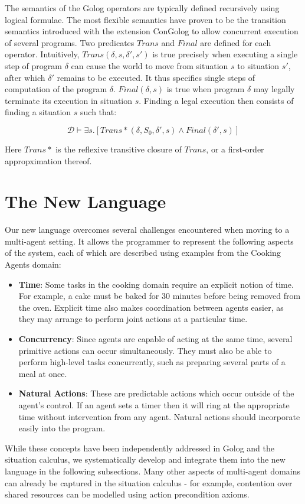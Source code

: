 \documentclass[letterpaper]{article}
\begin{document}
The semantics of the Golog operators are typically defined recursively
using logical formulae. The most flexible semantics have proven to
be the transition semantics introduced with the extension ConGolog
\cite{giacomo00congolog} to allow concurrent execution of several
programs. Two predicates $Trans$ and $Final$ are defined for each
operator. Intuitively, $Trans(\delta,s,\delta',s')$ is true precisely
when executing a single step of program $\delta$ can cause the world
to move from situation $s$ to situation $s'$, after which $\delta'$
remains to be executed. It thus specifies single steps of computation
of the program $\delta$. $Final(\delta,s)$ is true when program
$\delta$ may legally terminate its execution in situation $s$. Finding
a legal execution then consists of finding a situation $s$ such that:

\[
\mathcal{D}\models\exists s.\left[Trans*(\delta,S_{0},\delta',s)\wedge Final(\delta',s)\right]
\]


Here $Trans*$ is the reflexive transitive closure of $Trans$, or a first-order
appropximation thereof.


\section{The New Language}

\label{sec:Language-Features}

Our new language overcomes several challenges encountered when moving
to a multi-agent setting. It allows the programmer to represent the
following aspects of the system, each of which are described using
examples from the Cooking Agents domain:

\begin{itemize}
\item \textbf{Time}: Some tasks in the cooking domain require an explicit
notion of time. For example, a cake must be baked for 30 minutes before
being removed from the oven. Explicit time also makes coordination
between agents easier, as they may arrange to perform joint actions
at a particular time.
\item \textbf{Concurrency}: Since agents are capable of acting at the same
time, several primitive actions can occur simultaneously. They must
also be able to perform high-level tasks concurrently, such as preparing
several parts of a meal at once.
\item \textbf{Natural Actions}: These are predictable actions which occur
outside of the agent's control. If an agent sets a timer then it will
ring at the appropriate time without intervention from any agent.
Natural actions should incorporate easily into the program.
\end{itemize}
While these concepts have been independently addressed in Golog and
the situation calculus, we systematically develop and integrate them
into the new language in the following subsections. Many other aspects
of multi-agent domains can already be captured in the situation calculus
- for example, contention over shared resources can be modelled using
action precondition axioms.
\end{document}
